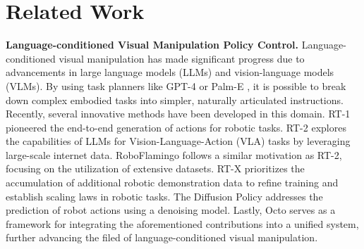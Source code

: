 \section{Related Work}
\label{sec:related_work}

\textbf{Language-conditioned Visual Manipulation Policy Control.} Language-conditioned visual manipulation has made significant progress due to advancements in large language models (LLMs) and vision-language models (VLMs).
By using task planners like GPT-4 \cite{achiam2023gpt} or Palm-E \cite{driess2023palm}, it is possible to break down complex embodied tasks into simpler, naturally articulated instructions. Recently, several innovative methods have been developed in this domain. RT-1 \cite{brohan2022rt} pioneered the end-to-end generation of actions for robotic tasks. RT-2 \cite{brohan2023rt} explores the capabilities of LLMs for Vision-Language-Action (VLA) tasks by leveraging large-scale internet data. RoboFlamingo \cite{li2024visionlanguage} follows a similar motivation as RT-2, focusing on the utilization of extensive datasets. RT-X prioritizes the accumulation of additional robotic demonstration data to refine training and establish scaling laws in robotic tasks. The Diffusion Policy \cite{chi2023diffusionpolicy} addresses the prediction of robot actions using a denoising model. Lastly, Octo \cite{octo_2023} serves as a framework for integrating the aforementioned contributions into a unified system, further advancing the filed of language-conditioned visual manipulation.

